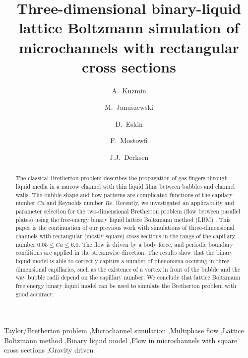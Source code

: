 \documentclass[preprint,12pt]{elsarticle}
\begin{document}
\begin{frontmatter}
\title{Three-dimensional binary-liquid lattice Boltzmann simulation of microchannels with rectangular
cross sections}
\author[uofa]{A.~Kuzmin}
\author[us]{M.~Januszewski}
\author[schlum]{D.~Eskin}
\author[schlum]{F.~Mostowfi}
\author[uofa]{J.J.~Derksen}
\address[uofa]{Chemical and Materials Engineering, University of Alberta\\ 7th Floor, ECERF, 9107
116 St, Edmonton, Alberta, T6G
2V4 Canada}
\address[us]{Insitute of Physics, University of Silesia, 40-007 Katowice, Poland}
\address[schlum]{Schlumberger DBR Technology Center\\ 9450 17 Ave NW, Edmonton, Alberta, T6N 1M9
Canada}
\begin{abstract}
The classical Bretherton problem describes the propagation of gas fingers through liquid media in a
narrow channel with
thin liquid films between bubbles and channel walls. The bubble shape and flow patterns are
complicated functions of the capilary number $Ca$ and Reynolds number $Re$. Recently, we
investigated
an applicability and parameter selection for the two-dimensional Bretherton problem
(flow
between parallel plates) using the free-energy binary liquid lattice Boltzmann method (LBM)
\cite{kuzmin-binary2d}. This paper is the continuation of our previous work with simulations of
three-dimensional channels with rectangular (mostly square) cross sections in the range of the capillary number $0.05\leq
Ca \leq
6.0$.
The flow is driven by a body force, and
periodic boundary conditions are applied in the streamwise direction. The results show that the
binary liquid model is able to correctly capture a number of phenomena occuring in three-dimensional
capillaries, such as the existence of a vortex in front of the bubble and the way bubble radii
depend on the capillary number.  We conclude that lattice Boltzmann free energy binary
liquid model can be used to simulate the Bretherton problem with good accuracy. 
\end{abstract}

\begin{keyword}
Taylor/Bretherton problem \sep Microchannel simulation \sep Multiphase flow \sep Lattice Boltzmann
method
\sep Binary liquid model \sep Flow in microchannels with square cross sections \sep Gravity driven

\end{keyword}

\end{frontmatter}
\linenumbers
\end{document}
